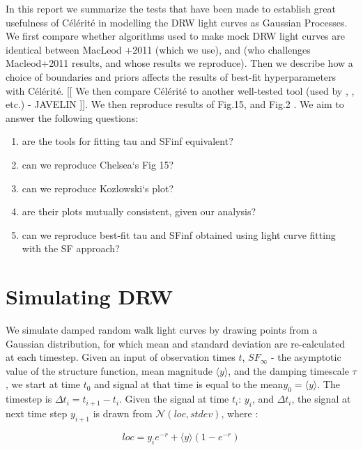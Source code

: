 \documentclass[fleqn,usenatbib]{mnras}  %
\begin{document}
In this report we summarize the tests that have been made to establish great usefulness of  C\'el\'erit\'e in modelling the DRW light curves as Gaussian Processes. We  first compare whether algorithms used to make mock DRW light curves are identical between MacLeod +2011 (which we use), and \cite{kozlowski2017a} (who challenges Macleod+2011 results, and whose results we reproduce). Then we describe how  a choice of boundaries and priors affects the results of best-fit hyperparameters with  C\'el\'erit\'e. [[ We then compare C\'el\'erit\'e  to another well-tested tool (used by \cite{kozlowski2016a}, \cite{zu2011}, etc.) - JAVELIN ]].  We then reproduce results of \cite{macleod2011} Fig.15, and \cite{kozlowski2017a} Fig.2 .  	We aim to answer the following questions: 
\begin{enumerate}
\item are the tools for fitting tau and SFinf equivalent?
\item can we reproduce Chelsea`s Fig 15?
\item can we reproduce Kozlowski`s plot? 
\item are their plots mutually consistent, given our analysis? 
\item can we reproduce best-fit tau and SFinf obtained using light curve
     fitting with the SF approach? 
\end{enumerate}




\section{Simulating DRW}
\label{sec:simDRW}

We simulate damped random walk light curves by drawing  points from a Gaussian distribution, for which mean and standard deviation are re-calculated at each timestep. Given an input of observation times $t$,   $SF_{\infty}$ - the asymptotic value of the structure function, mean magnitude  $\langle y \rangle$, and the damping timescale $\tau$, we start at time $t_{0}$ and signal at that time is equal to the mean$y_{0} = \langle y \rangle$. The timestep is   
$\Delta t_{i} = t_{i+1} - t_{i}$.  Given  the signal at time $t_{i}$: $y_{i}$,  and $\Delta t_{i}$,  the signal at next time step $y_{i+1}$ is drawn from  $\mathcal{N}(loc, stdev)$, where : 

\begin{equation}
loc = y_{i} e ^ { - r  }  + \langle y \rangle \left( 1 - e ^{ - r }\right)
\end{equation}
\end{document}
